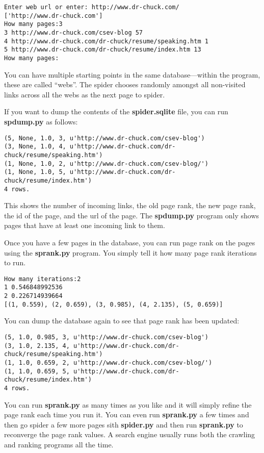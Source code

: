 \beforeverb
\begin{verbatim}
Enter web url or enter: http://www.dr-chuck.com/
['http://www.dr-chuck.com']
How many pages:3
3 http://www.dr-chuck.com/csev-blog 57
4 http://www.dr-chuck.com/dr-chuck/resume/speaking.htm 1
5 http://www.dr-chuck.com/dr-chuck/resume/index.htm 13
How many pages:
\end{verbatim}
\afterverb
%
You can have multiple starting points in the same database---within
the program, these are called ``webs''.   The spider
chooses randomly amongst all non-visited links across all
the webs as the next page to spider.

If you want to dump the contents of the {\bf spider.sqlite} file, you can 
run {\bf spdump.py} as follows:

\beforeverb
\begin{verbatim}
(5, None, 1.0, 3, u'http://www.dr-chuck.com/csev-blog')
(3, None, 1.0, 4, u'http://www.dr-chuck.com/dr-chuck/resume/speaking.htm')
(1, None, 1.0, 2, u'http://www.dr-chuck.com/csev-blog/')
(1, None, 1.0, 5, u'http://www.dr-chuck.com/dr-chuck/resume/index.htm')
4 rows.
\end{verbatim}
\afterverb
%
This shows the number of incoming links, the old page rank, the new page
rank, the id of the page, and the url of the page.  The {\bf spdump.py} program
only shows pages that have at least one incoming link to them.

Once you have a few pages in the database, you can run page rank on the
pages using the {\bf sprank.py} program.  You simply tell it how many page
rank iterations to run.

\beforeverb
\begin{verbatim}
How many iterations:2
1 0.546848992536
2 0.226714939664
[(1, 0.559), (2, 0.659), (3, 0.985), (4, 2.135), (5, 0.659)]
\end{verbatim}
\afterverb
%
You can dump the database again to see that page rank has been updated:

\beforeverb
\begin{verbatim}
(5, 1.0, 0.985, 3, u'http://www.dr-chuck.com/csev-blog')
(3, 1.0, 2.135, 4, u'http://www.dr-chuck.com/dr-chuck/resume/speaking.htm')
(1, 1.0, 0.659, 2, u'http://www.dr-chuck.com/csev-blog/')
(1, 1.0, 0.659, 5, u'http://www.dr-chuck.com/dr-chuck/resume/index.htm')
4 rows.
\end{verbatim}
\afterverb
%
You can run {\bf sprank.py} as many times as you like and it will simply refine
the page rank each time you run it.  You can even run {\bf sprank.py} a few times
and then go spider a few more pages sith {\bf spider.py} and then run {\bf sprank.py}
to reconverge the page rank values.  A search engine usually runs both the crawling and 
ranking programs all the time.

